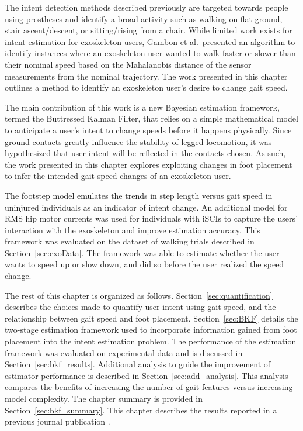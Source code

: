 The intent detection methods described previously are targeted towards people using prostheses and identify a broad activity such as walking on flat ground, stair ascent/descent, or sitting/rising from a chair. While limited work exists for intent estimation for exoskeleton users, Gambon et al.~presented an algorithm \cite{Gambon20b} to identify instances where an exoskeleton user wanted to walk faster or slower than their nominal speed based on the Mahalanobis distance of the sensor measurements from the nominal trajectory. The work presented in this chapter outlines a method to identify an exoskeleton user's desire to change gait speed. 

The main contribution of this work is a new Bayesian estimation framework, termed the Buttressed Kalman Filter, that relies on a simple mathematical model to anticipate a user's intent to change speeds before it happens physically. Since ground contacts greatly influence the stability of legged locomotion, it was hypothesized that user intent will be reflected in the contacts chosen. As such, the work presented in this chapter explores exploiting changes in foot placement to infer the intended gait speed changes of an exoskeleton user. 

The footstep model emulates the trends in step length versus gait speed in uninjured individuals as an indicator of intent change. An additional model for RMS hip motor currents was used for individuals with iSCIs to capture the users' interaction with the exoskeleton and improve estimation accuracy. This framework was evaluated on the dataset of walking trials described in Section~\ref{sec:exoData}. The framework was able to estimate whether the user wants to speed up or slow down, and did so before the user realized the speed change.

The rest of this chapter is organized as follows. Section~\ref{sec:quantification} describes the choices made to quantify user intent using gait speed, and the relationship between gait speed and foot placement. Section~\ref{sec:BKF} details the two-stage estimation framework used to incorporate information gained from foot placement into the intent estimation problem. The performance of the estimation framework was evaluated on experimental data and is discussed in Section~\ref{sec:bkf_results}. Additional analysis to guide the improvement of estimator performance is described in Section~\ref{sec:add_analysis}. This analysis compares the benefits of increasing the number of gait features versus increasing model complexity. The chapter summary is provided in Section~\ref{sec:bkf_summary}. This chapter describes the results reported in a previous journal publication \cite{karulkar2021using}.

